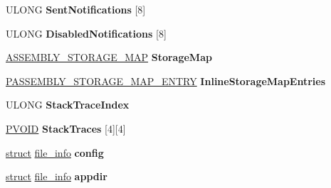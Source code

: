 \begin{DoxyCompactItemize}
\mbox{\label{struct___a_c_t_i_v_a_t_i_o_n___c_o_n_t_e_x_t_a8419ee652c44eac266a5c4fe845eb514}} 
U\+L\+O\+NG {\bfseries Sent\+Notifications} \mbox{[}8\mbox{]}
\item 
\mbox{\label{struct___a_c_t_i_v_a_t_i_o_n___c_o_n_t_e_x_t_a5239bae246addfbd1be4e4cb6097ef62}} 
U\+L\+O\+NG {\bfseries Disabled\+Notifications} \mbox{[}8\mbox{]}
\item 
\mbox{\label{struct___a_c_t_i_v_a_t_i_o_n___c_o_n_t_e_x_t_a3a708bdff68f03fa6024d5f43c3d351c}} 
\hyperlink{struct___a_s_s_e_m_b_l_y___s_t_o_r_a_g_e___m_a_p}{A\+S\+S\+E\+M\+B\+L\+Y\+\_\+\+S\+T\+O\+R\+A\+G\+E\+\_\+\+M\+AP} {\bfseries Storage\+Map}
\item 
\mbox{\label{struct___a_c_t_i_v_a_t_i_o_n___c_o_n_t_e_x_t_a2291549e72a0bc964a7b79a481b5d1e6}} 
\hyperlink{struct___a_s_s_e_m_b_l_y___s_t_o_r_a_g_e___m_a_p___e_n_t_r_y}{P\+A\+S\+S\+E\+M\+B\+L\+Y\+\_\+\+S\+T\+O\+R\+A\+G\+E\+\_\+\+M\+A\+P\+\_\+\+E\+N\+T\+RY} {\bfseries Inline\+Storage\+Map\+Entries}
\item 
\mbox{\label{struct___a_c_t_i_v_a_t_i_o_n___c_o_n_t_e_x_t_a62cb5f358b8ada2292f795be6d87bc34}} 
U\+L\+O\+NG {\bfseries Stack\+Trace\+Index}
\item 
\mbox{\label{struct___a_c_t_i_v_a_t_i_o_n___c_o_n_t_e_x_t_a6565d74206d5a2bb11e2f79fe8af63e1}} 
\hyperlink{interfacevoid}{P\+V\+O\+ID} {\bfseries Stack\+Traces} \mbox{[}4\mbox{]}\mbox{[}4\mbox{]}
\item 
\mbox{\label{struct___a_c_t_i_v_a_t_i_o_n___c_o_n_t_e_x_t_a7a43aca2a39069133e85853522d5c11c}} 
\hyperlink{interfacestruct}{struct} \hyperlink{structfile__info}{file\+\_\+info} {\bfseries config}
\item 
\mbox{\label{struct___a_c_t_i_v_a_t_i_o_n___c_o_n_t_e_x_t_aa1506bb14affbc75d0266a536a341fa9}} 
\hyperlink{interfacestruct}{struct} \hyperlink{structfile__info}{file\+\_\+info} {\bfseries appdir}

\end{DoxyCompactItemize}
